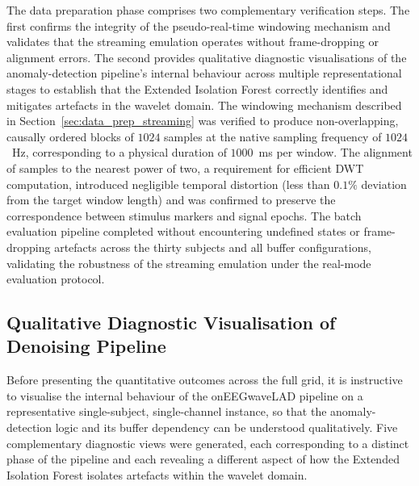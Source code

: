 \documentclass[MScCS,12pt,oneside,final]{uccthesis}
\begin{document}
The data preparation phase comprises two complementary verification steps. The first confirms the integrity of the pseudo-real-time windowing mechanism and validates that the streaming emulation operates without frame-dropping or alignment errors. The second provides qualitative diagnostic visualisations of the anomaly-detection pipeline's internal behaviour across multiple representational stages to establish that the Extended Isolation Forest correctly identifies and  mitigates artefacts in the wavelet domain. The windowing mechanism described in Section~\ref{sec:data_prep_streaming} was verified to produce non-overlapping, causally ordered blocks of $1024$ samples at the native sampling frequency of $1024$~Hz, corresponding to a physical duration of $1000$~ms per window. The alignment of samples to the nearest power of two, a requirement for efficient DWT computation, introduced negligible temporal distortion (less than $0.1\%$ deviation from the target window length) and was confirmed to preserve the correspondence between stimulus markers and signal epochs. The batch evaluation pipeline completed without encountering undefined states or frame-dropping artefacts across the thirty subjects and all buffer configurations, validating the robustness of the streaming emulation under the real-mode evaluation protocol.

    \subsection{Qualitative Diagnostic Visualisation of Denoising Pipeline}
\label{subsec:qualitative_visualization}

Before presenting the quantitative outcomes across the full grid, it is instructive to visualise the internal behaviour of the onEEGwaveLAD pipeline on a representative single-subject, single-channel instance, so that the anomaly-detection logic and its buffer dependency can be understood qualitatively. Five complementary diagnostic views were generated, each corresponding to a distinct phase of the pipeline and each revealing a different aspect of how the Extended Isolation Forest isolates artefacts within the wavelet domain.
\end{document}
